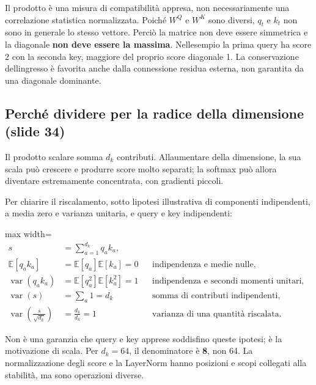 \documentclass[11pt,a4paper,oneside,openany]{book}
\begin{document}
Il prodotto è una misura di compatibilità appresa, non necessariamente una correlazione statistica normalizzata. Poiché \(W^Q\) e \(W^K\) sono diversi, \(q_t\) e \(k_t\) non sono in generale lo stesso vettore. Perciò la matrice non deve essere simmetrica e la diagonale \textbf{non deve essere la massima}. Nell\textquotesingle esempio la prima query ha score 2 con la seconda key, maggiore del proprio score diagonale 1. La conservazione dell\textquotesingle ingresso è favorita anche dalla connessione residua esterna, non garantita da una diagonale dominante.

\subsection{Perché dividere per la radice della dimensione (slide 34)}\label{f04-r635}

Il prodotto scalare somma \(d_k\) contributi. All\textquotesingle aumentare della dimensione, la sua scala può crescere e produrre score molto separati; la softmax può allora diventare estremamente concentrata, con gradienti piccoli.

Per chiarire il riscalamento, sotto l\textquotesingle ipotesi illustrativa di componenti indipendenti, a media zero e varianza unitaria, e query e key indipendenti:

\begin{center}
\begin{adjustbox}{max width=\linewidth}
$\displaystyle 
\begin{aligned}
s&=\sum_{a=1}^{d_k}q_ak_a,\\
\mathbb E[q_ak_a]&=\mathbb E[q_a]\mathbb E[k_a]=0
&&\text{indipendenza e medie nulle},\\
\operatorname{var}(q_ak_a)&=\mathbb E[q_a^2]\mathbb E[k_a^2]=1
&&\text{indipendenza e secondi momenti unitari},\\
\operatorname{var}(s)&=\sum_a1=d_k
&&\text{somma di contributi indipendenti},\\
\operatorname{var}\!\left(\frac{s}{\sqrt{d_k}}\right)&=\frac{d_k}{d_k}=1
&&\text{varianza di una quantità riscalata}.
\end{aligned}
$
\end{adjustbox}
\end{center}

Non è una garanzia che query e key apprese soddisfino queste ipotesi; è la motivazione di scala. Per \(d_k=64\), il denominatore è \textbf{8}, non 64. La normalizzazione degli score e la LayerNorm hanno posizioni e scopi collegati alla stabilità, ma sono operazioni diverse.
\end{document}
